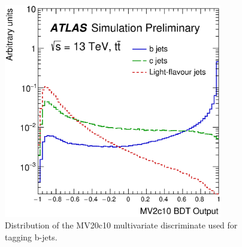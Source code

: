 \begin{figure}[htb]
  \begin{center}
    \includegraphics[width=0.85\textwidth]{figures/JetCalib/MV20c10.eps}\hspace{0.05\textwidth}
\end{center}
\caption{Distribution of the MV20c10 multivariate discriminate used for tagging b-jets.  }
\label{fig:MV20c10} 
\end{figure}

